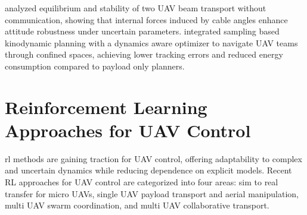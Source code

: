 \cite{gabellieri_equilibria_2023} analyzed equilibrium and stability of two UAV beam transport without communication, showing that internal forces induced by cable angles enhance attitude robustness under uncertain parameters. \cite{wahba_kinodynamic_2024} integrated sampling based kinodynamic planning with a dynamics aware optimizer to navigate UAV teams through confined spaces, achieving lower tracking errors and reduced energy consumption compared to payload only planners.

\section{Reinforcement Learning Approaches for UAV Control}
\gls{rl} methods are gaining traction for UAV control, offering adaptability to complex and uncertain dynamics while reducing dependence on explicit models. Recent RL approaches for UAV control are categorized into four areas: sim to real transfer for micro UAVs, single UAV payload transport and aerial manipulation, multi UAV swarm coordination, and multi UAV collaborative transport.

